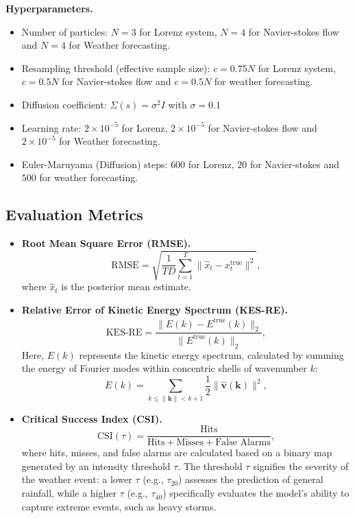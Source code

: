 \documentclass{article}
\theoremstyle{plain}
\theoremstyle{definition}
\theoremstyle{remark}
\begin{document}
\textbf{Hyperparameters.}
\begin{itemize}
    \item Number of particles: $N = 3$ for Lorenz system, $N = 4$ for Navier-stokes flow and $N = 4$ for Weather forecasting.
    \item Resampling threshold (effective sample size):  $c = 0.75N$ for Lorenz system,  $c = 0.5N$ for Navier-stokes flow and  $c = 0.5N$ for weather forecasting.
    \item Diffusion coefficient: $\Sigma(s) = \sigma^2 I$ with $\sigma = 0.1$
    \item Learning rate: $2\times10^{-5}$ for Lorenz, $2\times10^{-5}$ for Navier-stokes flow and $2\times10^{-5}$ for Weather forecasting.
    \item Euler-Maruyama (Diffusion) steps: $600$ for Lorenz, $20$ for Navier-stokes and $500$ for weather forecasting.
\end{itemize}

\subsection{Evaluation Metrics}
\label{app:metrics}

\begin{itemize}
    \item \textbf{Root Mean Square Error (RMSE).} 
    \[
    \text{RMSE} = \sqrt{\frac{1}{TD} \sum_{t=1}^T \| \hat{x}_t - x_t^{\text{true}} \|^2},
    \]
    where $\hat{x}_t$ is the posterior mean estimate.
    
    \item \textbf{Relative Error of Kinetic Energy Spectrum (KES-RE).} 
    \[
    \text{KES-RE} = \frac{\| \hat{E}(k) - E^{\text{true}}(k) \|_2}{\| E^{\text{true}}(k) \|_2},
    \]
    Here, $E(k)$ represents the kinetic energy spectrum, calculated by summing the energy of Fourier modes within concentric shells of wavenumber $k$:
    \[
    E(k) = \sum_{k \le \|\mathbf{k}\| < k+1} \frac{1}{2} \|\hat{\mathbf{v}}(\mathbf{k})\|^2,
    \]

    \item \textbf{Critical Success Index (CSI).} 
    \[
    \text{CSI}(\tau) = \frac{\text{Hits}}{\text{Hits} + \text{Misses} + \text{False Alarms}},
    \]
    where hits, misses, and false alarms are calculated based on a binary map generated by an intensity threshold $\tau$. The threshold $\tau$ signifies the severity of the weather event: a lower $\tau$ (e.g., $\tau_{20}$) assesses the prediction of general rainfall, while a higher $\tau$ (e.g., $\tau_{40}$) specifically evaluates the model's ability to capture extreme events, such as heavy storms.
\end{itemize}
\end{document}
